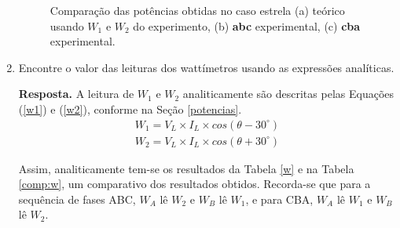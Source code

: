 \documentclass[a4paper,12pt,oneside,openany,table,xcdraw]{article}
\begin{document}
\begin{enumerate}[1)]
\begin{figure}[H]
\centering
{}\hfill
{}\hfill
{}
\caption{Comparação das potências obtidas no caso estrela (a) teórico usando $W_1$ e $W_2$ do experimento, (b) \textbf{abc} experimental, (c) \textbf{cba} experimental.}
\label{pot-tab1}
\end{figure}


\item  Encontre o valor das leituras dos wattímetros usando as expressões analíticas. \vspace{0.8mm}

\textbf{Resposta.} A leitura de $W_1$ e $W_2$ analiticamente são descritas pelas Equações (\ref{w1}) e (\ref{w2}), conforme na Seção \ref{potencias}.
\begin{gather}
W_1 = V_L \times I_L \times cos(\theta - 30^\circ)\label{w1}\\
W_2 = V_L \times I_L \times cos(\theta + 30^\circ)\label{w2}
\end{gather}

Assim, analiticamente tem-se os resultados da Tabela \ref{w} e na Tabela \ref{comp:w}, um comparativo dos resultados obtidos. Recorda-se que para a sequência de fases ABC, $W_A$ lê $W_2$ e $W_B$ lê $W_1$, e para CBA, $W_A$ lê $W_1$ e $W_B$ lê $W_2$.


\end{enumerate}
\end{document}
